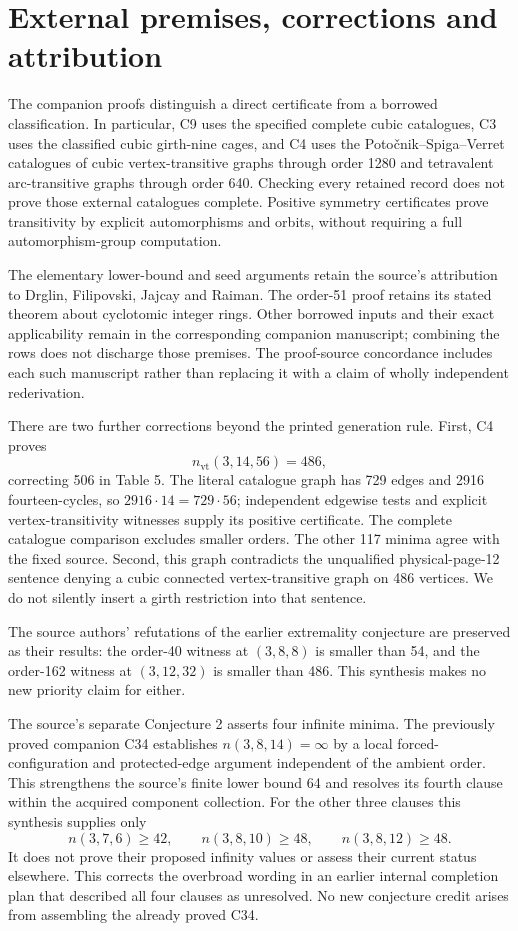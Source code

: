 \documentclass[11pt,a4paper]{article}
\newcommand{\vt}{\mathrm{vt}}
\begin{document}


\section{External premises, corrections and attribution}
The companion proofs distinguish a direct certificate from a borrowed
classification. In particular, C9 uses the specified complete cubic
catalogues, C3 uses the classified cubic girth-nine cages, and C4 uses
the Poto\v cnik--Spiga--Verret catalogues of cubic vertex-transitive
graphs through order 1280 and tetravalent arc-transitive graphs through
order 640. Checking every retained record does not prove those external
catalogues complete. Positive symmetry certificates prove transitivity
by explicit automorphisms and orbits, without requiring a full
automorphism-group computation.

The elementary lower-bound and seed arguments retain the source's
attribution to Drglin, Filipovski, Jajcay and Raiman. The order-51 proof
retains its stated theorem about cyclotomic integer rings. Other borrowed
inputs and their exact applicability remain in the corresponding
companion manuscript; combining the rows does not discharge those
premises. The proof-source concordance includes each such manuscript
rather than replacing it with a claim of wholly independent rederivation.

There are two further corrections beyond the printed generation rule.
First, C4 proves
\[
                         n_{\vt}(3,14,56)=486,
\]
correcting 506 in Table 5. The literal catalogue graph has 729 edges
and 2916 fourteen-cycles, so $2916\cdot14=729\cdot56$; independent
edgewise tests and explicit vertex-transitivity witnesses supply its
positive certificate. The complete catalogue comparison excludes
smaller orders. The other 117 minima agree with the fixed source.
Second, this graph contradicts the unqualified physical-page-12 sentence
denying a cubic connected vertex-transitive graph on 486 vertices.
We do not silently insert a girth restriction into that sentence.

The source authors' refutations of the earlier extremality conjecture
are preserved as their results: the order-40 witness at $(3,8,8)$ is
smaller than 54, and the order-162 witness at $(3,12,32)$ is smaller
than 486. This synthesis makes no new priority claim for either.

The source's separate Conjecture 2 asserts four infinite minima. The
previously proved companion C34 establishes $n(3,8,14)=\infty$ by a
local forced-configuration and protected-edge argument independent of
the ambient order. This strengthens the source's finite lower bound 64
and resolves its fourth clause within the acquired component collection.
For the other three clauses this synthesis supplies only
\[
n(3,7,6)\ge42,\qquad n(3,8,10)\ge48,\qquad n(3,8,12)\ge48.
\]
It does not prove their proposed infinity values or assess their current
status elsewhere. This corrects the overbroad wording in an earlier
internal completion plan that described all four clauses as unresolved.
No new conjecture credit arises from assembling the already proved C34.
\end{document}
